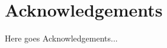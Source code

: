 \documentclass{standalone}
\begin{document}
\chapter*{Acknowledgements}
Here goes Acknowledgements...
\end{document}
